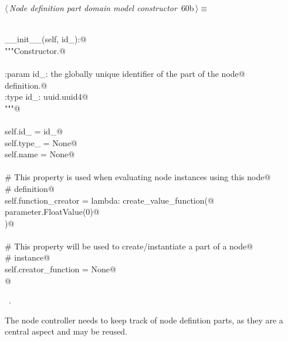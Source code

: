 \documentclass[
    a4paper,      %
    10pt,         %
    openright,    %
    notitlepage,  %
    parskip=half, %
]{scrreprt}       %
\theoremstyle{definition}                    %
\begin{document}
\begin{flushleft} \small
\begin{minipage}{\linewidth}\label{scrap101}\raggedright\small
{} $\langle\,${\itshape Node definition part domain model constructor}\nobreak\ {\footnotesize {60b}}$\,\rangle\equiv$
\vspace{-1exm}
\begin{list}{}{} \item
\mbox{}\lstinline@@\\
\mbox{}\lstinline@def __init__(self, id_):@\\
\mbox{}\lstinline@    """Constructor.@\\
\mbox{}\lstinline@@\\
\mbox{}\lstinline@    :param id_: the globally unique identifier of the part of the node@\\
\mbox{}\lstinline@                definition.@\\
\mbox{}\lstinline@    :type  id_: uuid.uuid4@\\
\mbox{}\lstinline@    """@\\
\mbox{}\lstinline@@\\
\mbox{}\lstinline@    self.id_         = id_@\\
\mbox{}\lstinline@    self.type_       = None@\\
\mbox{}\lstinline@    self.name        = None@\\
\mbox{}\lstinline@@\\
\mbox{}\lstinline@    # This property is used when evaluating node instances using this node@\\
\mbox{}\lstinline@    # definition@\\
\mbox{}\lstinline@    self.function_creator = lambda: create_value_function(@\\
\mbox{}\lstinline@        parameter.FloatValue(0)@\\
\mbox{}\lstinline@    )@\\
\mbox{}\lstinline@@\\
\mbox{}\lstinline@    # This property will be used to create/instantiate a part of a node@\\
\mbox{}\lstinline@    # instance@\\
\mbox{}\lstinline@    self.creator_function = None@\\
\mbox{}\lstinline@    @{\NWsep}
\end{list}
\vspace{-1.5ex}
\footnotesize
\begin{list}{}{\setlength{\itemsep}{-\parsep}\setlength{\itemindent}{-\leftmargin}}
\item \NWtxtMacroRefIn\ .

\item{}
\end{list}
\end{minipage}\vspace{4ex}
\end{flushleft}
The node controller needs to keep track of node defintion parts, as they are a
central aspect and may be reused.
\end{document}
